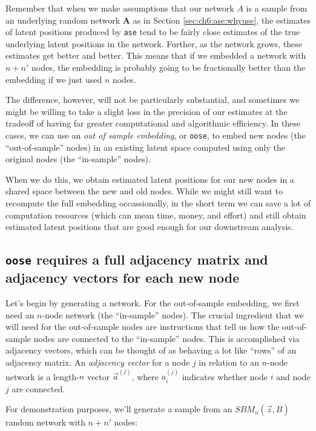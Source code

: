 Remember that when we make assumptions that our network $A$ is a sample from an underlying random network $\mathbf A$ as in Section \ref{sec:ch6:ase:whyuse}, the estimates of latent positions produced by \texttt{ase} tend to be fairly close estimates of the true underlying latent positions in the network. Further, as the network grows, these estimates get better and better. This means that if we embedded a network with $n + n'$ nodes, the embedding is probably going to be fractionally better than the embedding if we just used $n$ nodes. 

The difference, however, will not be particularly substantial, and sometimes we might be willing to take a slight loss in the precision of our estimates at the tradeoff of having far greater computational and algorithmic efficiency. In these cases, we can use an \textit{out of sample embedding}, or \texttt{oose}, to embed new nodes (the ``out-of-sample'' nodes) in an existing latent space computed using only the original nodes (the ``in-sample'' nodes). 

When we do this, we obtain estimated latent positions for our new nodes in a shared space between the new and old nodes. While we might still want to recompute the full embedding occassionally, in the short term we can save a lot of computation resources (which can mean time, money, and effort) and still obtain estimated latent positions that are good enough for our downstream analysis.

\subsection{\texttt{oose} requires a full adjacency matrix and adjacency vectors for each new node}

Let's begin by generating a network. For the out-of-sample embedding, we first need an $n$-node network (the ``in-sample'' nodes). The crucial ingredient that we will need for the out-of-sample nodes are instructions that tell us how the out-of-sample nodes are connected to the ``in-sample'' nodes. This is accomplished via adjacency vectors, which can be thought of as behaving a lot like ``rows'' of an adjacency matrix. An \textit{adjacency vector} for a node $j$ in relation to an $n$-node network is a length-$n$ vector $\vec a^{(j)}$, where $a_i^{(j)}$ indicates whether node $i$ and node $j$ are connected.

For demonstration purposes, we'll generate a sample from an $SBM_n(\vec z, B)$ random network with $n + n'$ nodes:

